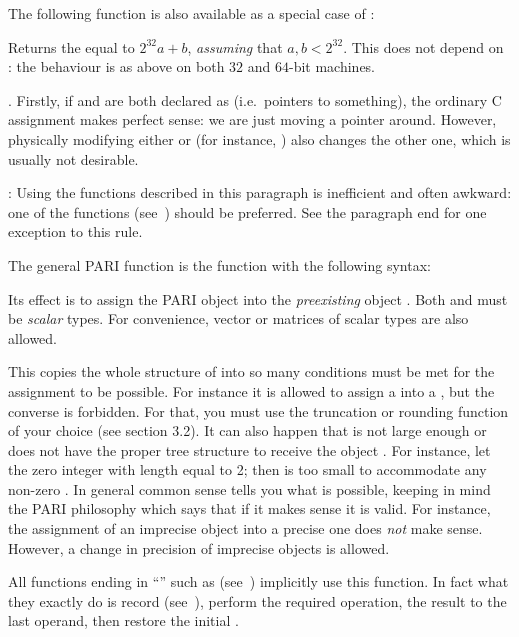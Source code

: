 \noindent The following function is also available as a special case of
:


Returns the  equal to $2^{32} a + b$, \emph{assuming} that
$a,b < 2^{32}$. This does not depend on : the behaviour is
as above on both $32$ and $64$-bit machines.

.
Firstly, if  and  are both declared as  (i.e.~pointers
to something), the ordinary C assignment  makes perfect sense: we
are just moving a pointer around. However, physically modifying either
 or  (for instance, ) also changes the other
one, which is usually not desirable. \label{se:assign}

: Using the functions described in this
paragraph is inefficient and often awkward: one of the 
functions (see~) should be preferred. See the paragraph
end for one exception to this rule.

\noindent
The general PARI  function is the function  with
the following syntax:


\noindent
Its effect is to assign the PARI object  into the \emph{preexisting}
object . Both  and  must be \emph{scalar} types. For
convenience, vector or matrices of scalar types are also allowed.

This copies the whole structure of  into  so many conditions
must be met for the assignment to be possible. For instance it is allowed to
assign a  into a , but the converse is forbidden. For
that, you must use the truncation or rounding function of your choice (see
section 3.2). It can also happen that  is not large enough or does not
have the proper tree structure to receive the object . For instance,
let  the zero integer with length equal to 2; then  is too
small to accommodate any non-zero . In general common sense tells
you what is possible, keeping in mind the PARI philosophy which says that if
it makes sense it is valid. For instance, the assignment of an imprecise
object into a precise one does \emph{not} make sense. However, a change in
precision of imprecise objects is allowed.

All functions ending in ``'' such as 
(see~) implicitly use this function. In fact what they
exactly do is record {} (see~), perform the
required operation,  the result to the last operand, then
restore the initial .

